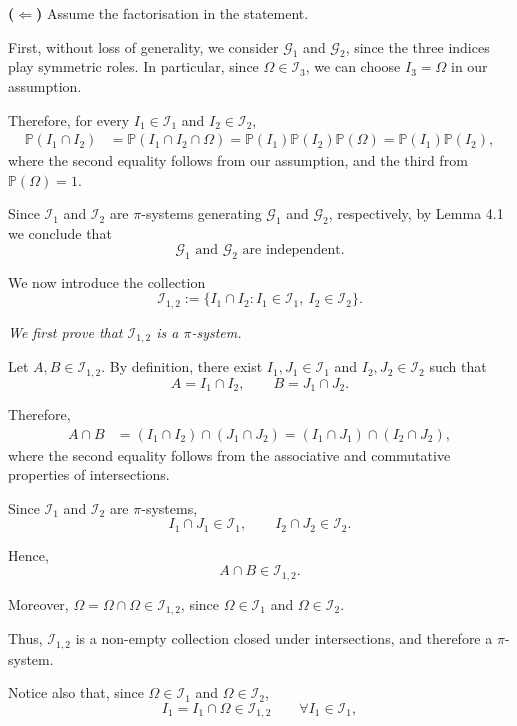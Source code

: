\documentclass[11pt,a4paper]{article}
\newcommand{\studyheading}[1]{{\color{StudyBlue}\normalfont\bfseries\boldmath #1}}
\begin{document}
\studyheading{($\Leftarrow$)} Assume the factorisation in the statement.

First, without loss of generality, we consider $\mathcal G_1$ and $\mathcal G_2$, since the three indices play symmetric roles. In particular, since $\Omega\in\mathcal I_3$, we can choose $I_3=\Omega$ in our assumption.

Therefore, for every $I_1\in\mathcal I_1$ and $I_2\in\mathcal I_2$,
\[
\begin{aligned}
\mathbb P(I_1\cap I_2)
&=\mathbb P(I_1\cap I_2\cap\Omega) =\mathbb P(I_1)\mathbb P(I_2)\mathbb P(\Omega) =\mathbb P(I_1)\mathbb P(I_2),
\end{aligned}
\]
where the second equality follows from our assumption, and the third from $\mathbb P(\Omega)=1$.

Since $\mathcal I_1$ and $\mathcal I_2$ are $\pi$-systems generating $\mathcal G_1$ and $\mathcal G_2$, respectively, by Lemma 4.1 we conclude that
\[
\mathcal G_1 \text{ and } \mathcal G_2
\text{ are independent}.
\]

We now introduce the collection
\[
\mathcal I_{1,2}
:=
\{I_1\cap I_2:
I_1\in\mathcal I_1,\ I_2\in\mathcal I_2\}.
\]

\emph{We first prove that $\mathcal I_{1,2}$ is a $\pi$-system.}

Let $A,B\in\mathcal I_{1,2}$. By definition, there exist $I_1,J_1\in\mathcal I_1$ and $I_2,J_2\in\mathcal I_2$ such that
\[
A=I_1\cap I_2,
\qquad
B=J_1\cap J_2.
\]

Therefore,
\[
\begin{aligned}
A\cap B
&=(I_1\cap I_2)\cap(J_1\cap J_2) =(I_1\cap J_1)\cap(I_2\cap J_2),
\end{aligned}
\]
where the second equality follows from the associative and commutative properties of intersections.

Since $\mathcal I_1$ and $\mathcal I_2$ are $\pi$-systems,
\[
I_1\cap J_1\in\mathcal I_1,
\qquad
I_2\cap J_2\in\mathcal I_2.
\]

Hence,
\[
A\cap B\in\mathcal I_{1,2}.
\]

Moreover, $\Omega=\Omega\cap\Omega\in\mathcal I_{1,2}$, since $\Omega\in\mathcal I_1$ and $\Omega\in\mathcal I_2$.

Thus, $\mathcal I_{1,2}$ is a non-empty collection closed under intersections, and therefore a $\pi$-system.

Notice also that, since $\Omega\in\mathcal I_1$ and $\Omega\in\mathcal I_2$,
\[
I_1=I_1\cap\Omega\in\mathcal I_{1,2}
\qquad\forall I_1\in\mathcal I_1,
\]
\end{document}
